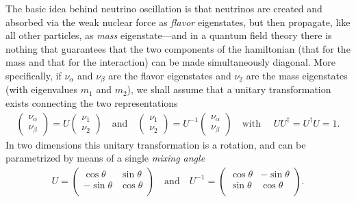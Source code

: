 The basic idea behind neutrino oscillation is that neutrinos are created and absorbed
via the weak nuclear force as \emph{flavor} eigenstates, but then propagate, like all
other particles, as \emph{mass} eigenstate---and in a quantum field theory there is
nothing that guarantees that the two components of the hamiltonian (that for the mass
and that for the interaction) can be made simultaneously diagonal. More specifically, if
$\nu_\alpha$ and $\nu_\beta$ are the flavor eigenstates
and $\nu_2$ are the mass eigenstates (with eigenvalues $m_1$ and $m_2$), we shall assume
that a unitary transformation exists connecting the two representations
\begin{align*}
  \begin{pmatrix}\nu_\alpha\\ \nu_\beta\end{pmatrix} = U
  \begin{pmatrix}\nu_1\\ \nu_2 \end{pmatrix}
  \quad\text{and}\quad
  \begin{pmatrix}\nu_1\\ \nu_2 \end{pmatrix} = U^{-1}
  \begin{pmatrix}\nu_\alpha\\ \nu_\beta\end{pmatrix} \quad\text{with }\quad
  U U^\dagger = U^\dagger U = 1.
\end{align*}
In two dimensions this unitary transformation is a rotation, and can be parametrized
by means of a single \emph{mixing angle}
\begin{align*}
  U =
  \begin{pmatrix}
    \cos\theta & \sin\theta \\
    -\sin\theta & \cos\theta \\
  \end{pmatrix}
  \quad\text{and}\quad
  U^{-1} =
  \begin{pmatrix}
    \cos\theta & -\sin\theta \\
    \sin\theta & \cos\theta \\
  \end{pmatrix}.
\end{align*}
